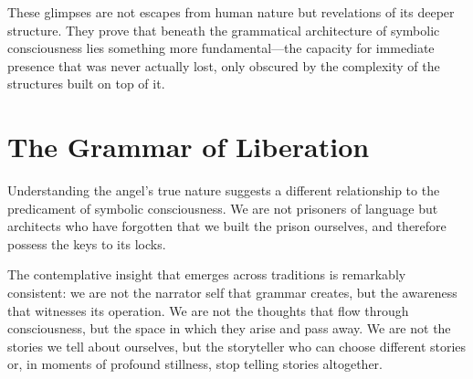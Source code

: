 \begin{center}
\end{center}

These glimpses are not escapes from human nature but revelations of its deeper structure. They prove that beneath the grammatical architecture of symbolic consciousness lies something more fundamental—the capacity for immediate presence that was never actually lost, only obscured by the complexity of the structures built on top of it.

\section{The Grammar of Liberation}

Understanding the angel's true nature suggests a different relationship to the predicament of symbolic consciousness. We are not prisoners of language but architects who have forgotten that we built the prison ourselves, and therefore possess the keys to its locks.

The contemplative insight that emerges across traditions is remarkably consistent: we are not the narrator self that grammar creates, but the awareness that witnesses its operation. We are not the thoughts that flow through consciousness, but the space in which they arise and pass away. We are not the stories we tell about ourselves, but the storyteller who can choose different stories or, in moments of profound stillness, stop telling stories altogether.

